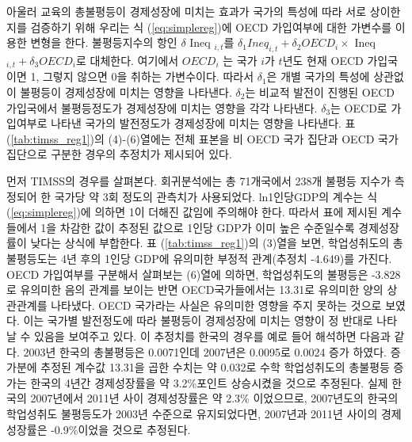 
\label{ans6}
아울러 교육의 총불평등이 경제성장에 미치는 효과가 국가의 특성에 따라 서로 상이한지를 검증하기 위해 우리는 식 (\ref{eq:simplereg})에 OECD 가입여부에 대한 가변수를 이용한 변형을 한다.
불평등지수의 항인 $\delta$ Ineq $_{i, t}$를 $\delta_{1} Ineq _{i, t}  + \delta _{2} O E C D_{i} \times$ Ineq $_{i, t} + \delta_{3} O E C D_{i} $로 대체한다.
여기에서 $OECD_i$ 는 국가 $i$가 $t$년도 현재 OECD 가입국이면 1, 그렇지 않으면 0을 취하는 가변수이다.
따라서 $\delta _ 1$은 개별 국가의 특성에 상관없이 불평등이 경제성장에 미치는 영향을 나타낸다. 
$\delta _ 2$는 비교적 발전이 진행된 OECD 가입국에서 불평등정도가 경제성장에 미치는 영향을 각각 나타낸다.
$\delta _ 3$는 OECD로 가입여부로 나타낸 국가의 발전정도가 경제성장에 미치는 영향을 나타낸다.
표 (\ref{tab:timss_reg1})의 (4)-(6)열에는 전체 표본을 비 OECD 국가 집단과 OECD 국가 집단으로 구분한 경우의 추정치가 제시되어 있다.  



먼저 TIMSS의 경우를 살펴본다.
회귀분석에는 총 71개국에서 238개 불평등 지수가 측정되어 한 국가당 약 3회 정도의 관측치가 사용되었다.
ln1인당GDP의 계수는 식 (\ref{eq:simplereg})에 의하면 1이 더해진 값임에 주의해야 한다. 따라서 표에 제시된 계수들에서 1을 차감한 값이 추정된 값으로 1인당 GDP가 이미 높은 수준일수록 경제성장률이 낮다는 상식에 부합한다.
표 (\ref{tab:timss_reg1})의 (3)열을 보면, 학업성취도의 총불평등도는 4년 후의 1인당 GDP에 유의미한 부정적 관계(추정치 -4.649)를 가진다.
OECD 가입여부를 구분해서 살펴보는 (6)열에 의하면, 학업성취도의 불평등은 -3.828로 유의미한 음의 관계를 보이는 반면 OECD국가들에서는 13.31로 유의미한 양의 상관관계를 나타냈다. 
OECD 국가라는 사실은 유의미한 영향을 주지 못하는 것으로 보였다.
이는 국가별 발전정도에 따라 불평등이 경제성장에 미치는 영향이 정 반대로 나타날 수 있음을 보여주고 있다.
이 추정치를 한국의 경우를 예로 들어 해석하면 다음과 같다.
2003년 한국의 총불평등은 0.0071인데 2007년은 0.0095로 0.0024 증가 하였다.
 증가분에 추정된 계수값 13.31을 곱한 수치는 약 0.032로 수학 학업성취도의 총불평등 증가는 한국의 4년간 경제성장률을 약 3.2\%포인트 상승시켰을 것으로 추정된다.
 실제 한국의 2007년에서 2011년 사이 경제성장률은 약 2.3\% 이었으므로, 2007년도의 한국의 학업성취도 불평등도가 2003년 수준으로 유지되었다면, 2007년과 2011년 사이의 경제성장률은 -0.9\%이었을 것으로 추정된다.

